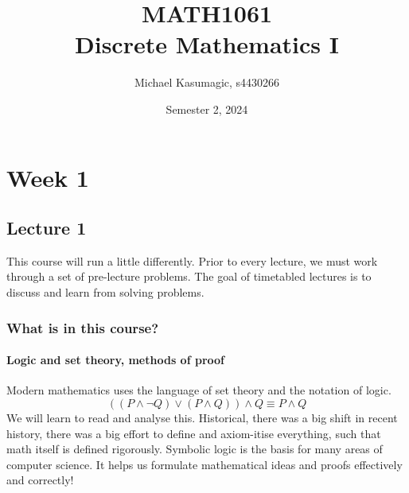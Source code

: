\documentclass{report}
\title{\Huge{MATH1061}\\Discrete Mathematics I}
\author{\huge{Michael Kasumagic, s4430266}}
\date{\huge{Semester 2, 2024}}
\begin{document}
\maketitle
\newpage%
\tableofcontents
\pagebreak

\chapter{Week 1}
\section{Lecture 1}
This course will run a little differently. Prior to every lecture, we must work through a set of pre-lecture problems. The goal of timetabled lectures is to discuss and learn from solving problems. \\

\subsection{What is in this course?}
\subsubsection*{Logic and set theory, methods of proof}
Modern mathematics uses the language of set theory and the notation of logic.
$$
((P \land \lnot Q) \lor (P\land Q)) \land Q \equiv P \land Q
$$
We will learn to read and analyse this. Historical, there was a big shift in recent history, there was a big effort to define and axiom-itise everything, such that math itself is defined rigorously. Symbolic logic is the basis for many areas of computer science. It helps us formulate mathematical ideas and proofs effectively and correctly! \\

\end{document}
